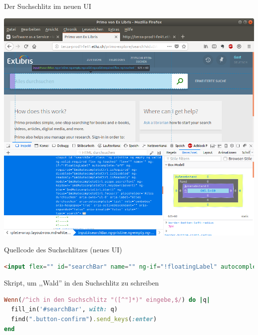 \begin{frame}{Der Suchschlitz im neuen UI}
  \begin{center}
    \includegraphics[width=1\textwidth]{pics/pnui-searchbar}
  \end{center}
\end{frame}

\begin{frame}[fragile]{Quellcode des Suchschlitzes (neues UI)}
  \selectfont
  \begin{lstlisting}[language=html]
<input flex="" id="searchBar" name="" ng-if="!floatingLabel" autocomplete="off" ng-required="$mdAutocompleteCtrl.isRequired" ng-disabled="$mdAutocompleteCtrl.isDisabled" ng-readonly="$mdAutocompleteCtrl.isReadonly" ng-model="$mdAutocompleteCtrl.scope.searchText" ng-keydown="$mdAutocompleteCtrl.keydown($event)" ng-blur="$mdAutocompleteCtrl.blur()" ng-focus="$mdAutocompleteCtrl.focus()" placeholder="Alles durchsuchen" aria-owns="ul-0" aria-label="Alles durchsuchen" aria-autocomplete="list" role="combobox" aria-haspopup="true" aria-activedescendant="" aria-expanded="false" class="ng-pristine ng-empty ng-valid ng-valid-required flex ng-touched" aria-invalid="false" style="" type="search">
  \end{lstlisting}
\end{frame}

\begin{frame}[fragile]{Skript, um ,,Wald'' in den Suchschlitz zu schreiben}
  \selectfont
  \begin{lstlisting}[language=ruby]
Wenn(/^ich in den Suchschlitz "([^"]*)" eingebe,$/) do |q|
  fill_in('#searchBar', with: q)
  find(".button-confirm").send_keys(:enter)
end
  \end{lstlisting}
\end{frame}


